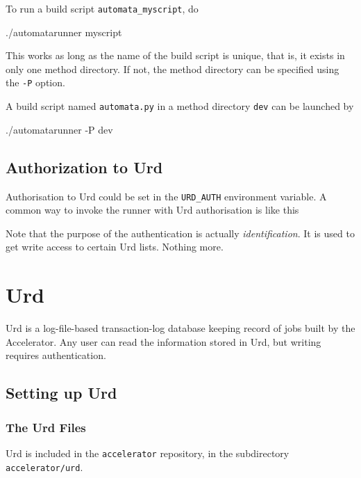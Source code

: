 To run a build script \texttt{automata\_myscript}, do
\begin{python}
./automatarunner myscript
\end{python}
This works as long as the name of the build script is unique, that is,
it exists in only one method directory.  If not, the method directory
can be specified using the \texttt{-P} option.

A build script named \texttt{automata.py} in a method
directory \texttt{dev} can be launched by
\begin{python}
./automatarunner -P dev
\end{python}



\subsection{Authorization to Urd}
Authorisation to Urd could be set in the \texttt{URD\_AUTH}
environment variable.  A common way to invoke the runner with Urd
authorisation is like this
\begin{shell}
\end{shell}
Note that the purpose of the authentication is
actually \textsl{identification}.  It is used to get write access to
certain Urd lists.  Nothing more.






\clearpage

\section{Urd}

Urd is a log-file-based transaction-log database keeping record of
jobs built by the Accelerator.  Any user can read the information
stored in Urd, but writing requires authentication.


\subsection{Setting up Urd}


\subsubsection{The Urd Files}

Urd is included in the \texttt{accelerator} repository, in the
subdirectory \texttt{accelerator/urd}.



